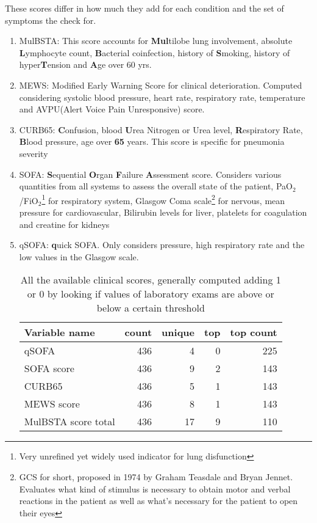\begin{enumerate}
These scores differ in how much they add for each condition and the set of symptoms the check for.
	\begin{enumerate}
		\item MulBSTA: This score accounts for \textbf{Mul}tilobe lung involvement, absolute \textbf{L}ymphocyte count, \textbf{B}acterial coinfection, history of \textbf{S}moking, history of hyper\textbf{T}ension and \textbf{A}ge over 60 yrs. \cite{MulBSTA}
		\item MEWS: Modified Early Warning Score for clinical deterioration. Computed considering systolic blood pressure, heart rate, respiratory rate, temperature and AVPU(Alert Voice Pain Unresponsive) score. \cite{MEWS}
		\item CURB65: \textbf{C}onfusion, blood \textbf{U}rea Nitrogen or Urea level, \textbf{R}espiratory Rate, \textbf{B}lood pressure, age over \textbf{65} years. This score is specific for pneumonia severity \cite{CURB65}
		\item SOFA:  \textbf{S}equential  \textbf{O}rgan  \textbf{F}ailure  \textbf{A}ssessment score. Considers various quantities from all systems to assess the overall state of the patient, PaO$_2$/FiO$_2$\footnote{Very unrefined yet widely used indicator for lung disfunction} for respiratory system, Glasgow Coma scale\footnote{GCS for short, proposed in 1974 by Graham Teasdale and Bryan Jennet. Evaluates what kind of stimulus is necessary to obtain motor and verbal reactions in the patient as well as what's necessary for the patient to open their eyes} for nervous, mean pressure for cardiovascular, Bilirubin levels for liver, platelets for coagulation and creatine for kidneys \cite{SOFA}
		\item qSOFA:  \textbf{q}uick SOFA. Only considers pressure, high respiratory rate and the low values in the Glasgow scale.
			\begin{table}[htbp]
			\caption{All the available clinical scores, generally computed adding 1 or 0 by looking if values of laboratory exams are above or below a certain threshold \label{tab:ClinicalScores}}
\centering
			\begin{tabular}{lrrrr}
			\toprule
			Variable name &  count &  unique &  top &  top count \\
			\midrule
			qSOFA               &    436 &       4 &    0 &   225 \\
			SOFA score          &    436 &       9 &    2 &   143 \\
			CURB65              &    436 &       5 &    1 &   143 \\
			MEWS score          &    436 &       8 &    1 &   143 \\
			MulBSTA score total &    436 &      17 &    9 &   110 \\
			\bottomrule
			\end{tabular}
			\end{table}
	\end{enumerate}
\end{enumerate}

